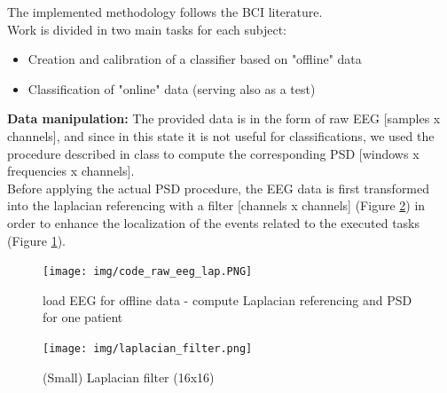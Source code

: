 The implemented methodology follows the BCI literature. \\
Work is divided in two main tasks for each subject: 
\begin{itemize}
\item Creation and calibration of a classifier based on "offline" data
\item Classification of "online" data (serving also as a test)
\end{itemize}\noindent
{\Large \textbf{Data manipulation:}}
The provided data is in the form of raw EEG [samples x channels], and since in this state it is not useful for classifications, we used the procedure described in class to compute the corresponding PSD [windows x frequencies x channels].\\
Before applying the actual PSD procedure, the EEG data is first transformed into the laplacian referencing with a filter [channels x channels] (Figure \ref{fig:laplacian_filter}) in order to enhance the localization of the events related to the executed tasks (Figure \ref{fig:code_raw_eeg_lap}).\\

\begin{figure}[h!]
	\begin{center}
		 \texttt{[image: img/code\_raw\_eeg\_lap.PNG]}
	\end{center}

	 \caption{load EEG for offline data - compute Laplacian referencing and PSD for one patient}
	 \label{fig:code_raw_eeg_lap}
\end{figure}

\begin{figure}[h!]
	\begin{center}
		 \texttt{[image: img/laplacian\_filter.png]}
	\end{center}

	 \caption{(Small) Laplacian filter (16x16)}
	 \label{fig:laplacian_filter}
\end{figure}

